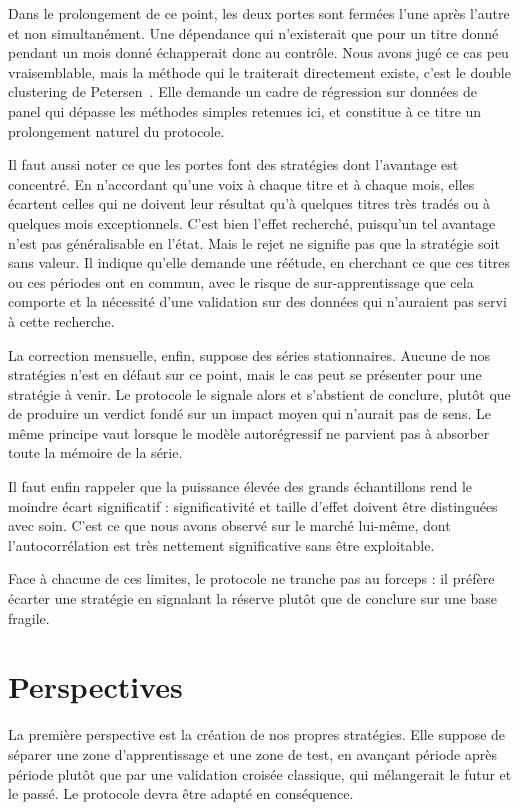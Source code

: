 Dans le prolongement de ce point, les deux portes sont fermées l'une après
l'autre et non simultanément. Une dépendance qui n'existerait que pour un
titre donné pendant un mois donné échapperait donc au contrôle. Nous avons
jugé ce cas peu vraisemblable, mais la méthode qui le traiterait directement
existe, c'est le double clustering de Petersen~\cite{petersen2009}. Elle
demande un cadre de régression sur données de panel qui dépasse les méthodes
simples retenues ici, et constitue à ce titre un prolongement naturel du
protocole.

Il faut aussi noter ce que les portes font des stratégies dont l'avantage est
concentré. En n'accordant qu'une voix à chaque titre et à chaque mois, elles
écartent celles qui ne doivent leur résultat qu'à quelques titres très tradés
ou à quelques mois exceptionnels. C'est bien l'effet recherché, puisqu'un tel
avantage n'est pas généralisable en l'état. Mais le rejet ne signifie pas que
la stratégie soit sans valeur. Il indique qu'elle demande une réétude, en
cherchant ce que ces titres ou ces périodes ont en commun, avec le risque de
sur-apprentissage que cela comporte et la nécessité d'une validation sur des
données qui n'auraient pas servi à cette recherche.

La correction mensuelle, enfin, suppose des séries stationnaires. Aucune de
nos stratégies n'est en défaut sur ce point, mais le cas peut se présenter
pour une stratégie à venir. Le protocole le signale alors et s'abstient de
conclure, plutôt que de produire un verdict fondé sur un impact moyen qui
n'aurait pas de sens. Le même principe vaut lorsque le modèle autorégressif
ne parvient pas à absorber toute la mémoire de la série.

Il faut enfin rappeler que la puissance élevée des grands échantillons rend le
moindre écart significatif : significativité et taille d'effet doivent être
distinguées avec soin. C'est ce que nous avons observé sur le marché lui-même,
dont l'autocorrélation est très nettement significative sans être exploitable.

Face à chacune de ces limites, le protocole ne tranche pas au forceps : il
préfère écarter une stratégie en signalant la réserve plutôt que de conclure
sur une base fragile.

\section{Perspectives}
\label{sec:perspectives}

La première perspective est la création de nos propres stratégies. Elle
suppose de séparer une zone d'apprentissage et une zone de test, en avançant
période après période plutôt que par une validation croisée classique, qui
mélangerait le futur et le passé. Le protocole devra être adapté en
conséquence.

